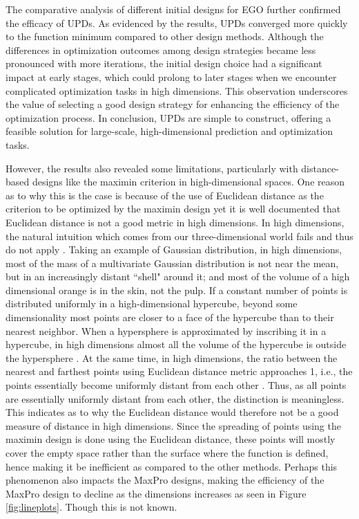 \documentclass [PhD] {package/uclathes}
\begin{document}
The comparative analysis of different initial designs for EGO further confirmed the efficacy of UPDs. As evidenced by the results, UPDs converged more quickly to the function minimum compared to other design methods. Although the differences in optimization outcomes among design strategies became less pronounced with more iterations, the initial design choice had a significant impact at early stages, which could prolong to later stages when we encounter complicated optimization tasks in high dimensions. This observation underscores the value of selecting {a good} design strategy for enhancing the efficiency of the optimization process. In conclusion, UPDs are simple to construct, offering a  feasible solution for large-scale, high-dimensional prediction and optimization tasks.


However, the results also revealed some limitations, particularly with distance-based designs like the maximin criterion in high-dimensional spaces. One reason as to why this is the case is because of the use of Euclidean distance as the criterion to be optimized by the maximin design yet it is well documented that Euclidean distance is not a good metric in high dimensions. In high dimensions, the natural intuition which comes from our three-dimensional world fails and thus do not apply \parencite{domingos2012few}. Taking an example of Gaussian distribution, in high dimensions, most of the mass of a multivariate Gaussian distribution is not near the mean, but in an increasingly distant ``shell" around it; and most of the volume of a high dimensional orange is in the skin, not the pulp. If a constant number of points is distributed uniformly in a high-dimensional hypercube, beyond some dimensionality most points are closer to a face of the hypercube than to their nearest neighbor. When a hypersphere is approximated by inscribing it in a hypercube, in high dimensions almost all the volume of the hypercube is outside the hypersphere \parencite{domingos2012few}. At the same time, in high dimensions, the ratio between the nearest and farthest points using Euclidean distance metric approaches 1, i.e., the points essentially become uniformly distant from each other \parencite{aggarwal2001surprising}. Thus, as all points are essentially uniformly distant from each other, the distinction is meaningless. This indicates as to why the Euclidean distance would therefore not be a good measure of distance in high dimensions. Since the spreading of points using the maximin design is done using the Euclidean distance, these points will mostly cover the empty space rather than the surface where the function is defined, hence making it be inefficient as compared to the other methods.
Perhaps this phenomenon also impacts the MaxPro designs, making the efficiency of the MaxPro design to decline as the dimensions increases as seen in Figure \ref{fig:lineplots}. Though this is not known.
\end{document}
